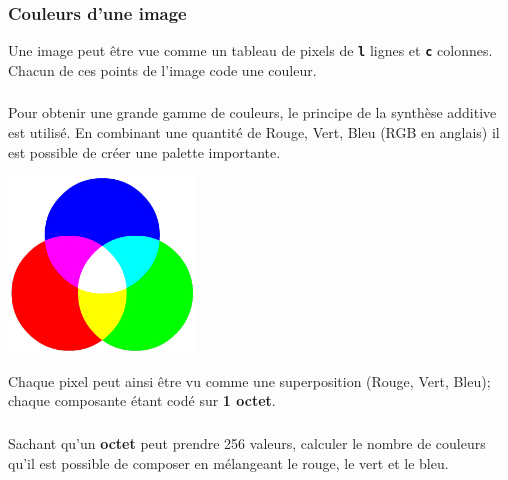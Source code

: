 \documentclass[svgnames,11pt]{beamer}
\begin{document}
\begin{frame}
    \frametitle{Couleurs d'une image}

    Une image peut être vue comme un tableau de pixels de \textbf{\texttt{l}} lignes et \textbf{\texttt{c}} colonnes. Chacun de ces points de l'image code une couleur.
    \begin{center}
    \end{center}
\end{frame}
\begin{frame}
    \frametitle{}

    Pour obtenir une grande gamme de couleurs, le principe de la synthèse additive est utilisé. En combinant une quantité de Rouge, Vert, Bleu (RGB en anglais) il est possible de créer une palette importante.
    \begin{center}
        \centering
        \includegraphics[width=5cm]{ressources/additive.jpg}
        \label{IMG}
    \end{center}
    Chaque pixel peut ainsi être vu comme une superposition (Rouge, Vert, Bleu); chaque composante étant codé sur \textbf{1 octet}.
\end{frame}
\begin{frame}
    \frametitle{}

    \begin{activite}
        Sachant qu'un \textbf{octet} peut prendre 256 valeurs, calculer le nombre de couleurs qu'il est possible de composer en mélangeant le rouge, le vert et le bleu.
    \end{activite}

\end{frame}
\end{document}
